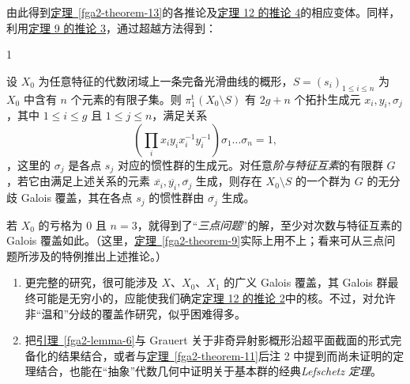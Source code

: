 \par{}由此得到\hyperref[fga2-theorem-13]{定理~\ref*{fga2-theorem-13}}的各推论及\hyperref[fga2-theorem-12-corollary-4]{定理 12 的推论 4}的相应变体。同样，利用\hyperref[fga2-theorem-9-corollary-3]{定理 9 的推论 3}，通过超越方法得到：
\begin{corollary}{1}\label{fga2-theorem-14-corollary-1}\skipsinglepar
\par{}设 \(X_0\) 为任意特征的代数闭域上一条完备光滑曲线的概形，\(S=(s_i)_{1\leqslant  i\leqslant  n}\) 为 \(X_0\) 中含有 \(n\) 个元素的有限子集。则 \(\pi _1^\mathrm {t}(X_0\setminus  S)\) 有 \(2g+n\) 个拓扑生成元 \(x_i,y_i,\sigma _j\)，其中 \(1\leqslant  i\leqslant  g\) 且 \(1\leqslant  j\leqslant  n\)，满足关系 \[       \left (\prod _i x_iy_ix_i^{-1}y_i^{-1}\right )\sigma _1\ldots \sigma _n = 1,     \]，这里的 \(\sigma _j\) 是各点 \(s_j\) 对应的惯性群的生成元。对任意\emph{阶与特征互素}的有限群 \(G\)，若它由满足上述关系的元素 \(\overline {x_i},\overline {y_i},\overline {\sigma _j}\) 生成，则存在 \(X_0\setminus  S\) 的一个群为 \(G\) 的无分歧 Galois 覆盖，其在各点 \(s_j\) 的惯性群由 \(\overline {\sigma _j}\) 生成。\end{corollary}
\par{}若 \(X_0\) 的亏格为 \(0\) 且 \(n=3\)，就得到了“\emph{三点问题}”的解，至少对次数与特征互素的 Galois 覆盖如此。（这里，\hyperref[fga2-theorem-9]{定理~\ref*{fga2-theorem-9}}实际上用不上；看来可从三点问题所涉及的特例推出上述推论。）
\begin{remarks}{}\label{fga2-8-remarks-ii}\skipsinglepar
\begin{enumerate}\item{}更完整的研究，很可能涉及 \(X\)、\(X_0\)、\(X_1\) 的广义 Galois 覆盖，其 Galois 群最终可能是无穷小的，应能使我们确定\hyperref[fga2-theorem-12-corollary-2]{定理 12 的推论 2}中的核。不过，对允许非“温和”分歧的覆盖作研究，似乎困难得多。

    \item{}把\hyperref[fga2-lemma-6]{引理~\ref*{fga2-lemma-6}}与 Grauert 关于非奇异射影概形沿超平面截面的形式完备化的结果结合，或者与\hyperref[fga2-theorem-11]{定理~\ref*{fga2-theorem-11}}后注 2 中提到而尚未证明的定理结合，也能在“抽象”代数几何中证明关于基本群的经典\emph{Lefschetz 定理}。\end{enumerate}\end{remarks}


